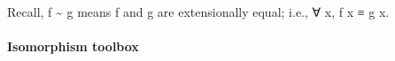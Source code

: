 Recall, f \textasciitilde{} g means f and g are extensionally equal;
i.e., ∀ x, f x ≡ g x.

\paragraph{Isomorphism toolbox}\label{isomorphism-toolbox}

\begin{code}%
\>[0]\AgdaSpace{}%
\AgdaModule{\AgdaUnderscore{}}\AgdaSpace{}%
\AgdaSymbol{\{}\AgdaSpace{}%
\AgdaSpace{}%
\AgdaSymbol{:}\AgdaSpace{}%
\AgdaSymbol{\}\{}\AgdaSpace{}%
\AgdaSymbol{:}\AgdaSpace{}%
\AgdaSpace{}%
\AgdaSpace{}%
\AgdaSymbol{\}\{}\AgdaSpace{}%
\AgdaSymbol{:}\AgdaSpace{}%
\AgdaSpace{}%
\AgdaSpace{}%
\AgdaSymbol{\}}\AgdaSpace{}%
\<%
\\
%
\\[\AgdaEmptyExtraSkip]%
\>[0][@{}l@{\AgdaIndent{0}}]%
\>[1]\AgdaSpace{}%
\AgdaSymbol{:}\AgdaSpace{}%
\AgdaSymbol{(}\AgdaSpace{}%
\AgdaSymbol{:}\AgdaSpace{}%
\AgdaSpace{}%
\AgdaSpace{}%
\AgdaSymbol{)}\AgdaSpace{}%
\AgdaSpace{}%
\AgdaSpace{}%
\AgdaSpace{}%
\<%
\\
%
\>[1]\AgdaSpace{}%
\AgdaSpace{}%
\AgdaSymbol{=}\AgdaSpace{}%
\AgdaSpace{}%
\AgdaSpace{}%
\<%
\\
%
\\[\AgdaEmptyExtraSkip]%
%
\>[1]\AgdaSpace{}%
\AgdaSymbol{:}\AgdaSpace{}%
\AgdaSymbol{(}\AgdaSpace{}%
\AgdaSymbol{:}\AgdaSpace{}%
\AgdaSpace{}%
\AgdaSpace{}%
\AgdaSymbol{)}\AgdaSpace{}%
\AgdaSpace{}%
\AgdaSpace{}%
\AgdaSpace{}%
\<%
\\
%
\>[1]\AgdaSpace{}%
\AgdaSpace{}%
\AgdaSymbol{=}\AgdaSpace{}%
\AgdaSpace{}%
\AgdaSpace{}%
\AgdaSpace{}%
\<%
\\
%
\\[\AgdaEmptyExtraSkip]%
%
\>[1]\AgdaSpace{}%

\end{code}
